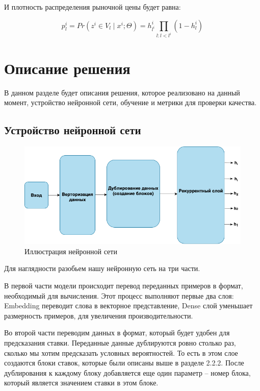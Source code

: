 \documentclass[times,specification,annotation]{itmo-student-thesis}
\begin{document}
И плотность распределения рыночной цены будет равна:

\begin{equation}\label{eq:nnP}
    p_l^i = Pr(z^i \in V_l \mid x^i; \Theta) = h_{l^i}^i \prod_{l: l < l^i} (1 - h_l^i)
\end{equation}


\section{Описание решения}

В данном разделе будет описания решения, которое реализовано на данный момент, устройство нейронной сети, обучение и метрики для проверки качества.

\subsection{Устройство нейронной сети}

\begin{figure}[h]
    \caption{Иллюстрация нейронной сети}
    \centering
    \includegraphics{nn.png}
\end{figure}

Для наглядности разобьем нашу нейронную сеть на три части.

В первой части модели происходит перевод переданных примеров в формат, необходимый для вычисления. 
Этот процесс выполняют первые два слоя: Embedding переводит слова в векторное представление, 
Dense слой уменьшает размерность примеров, для увеличения производительности.

Во второй части переводим данных в формат, который будет удобен для предсказания ставки. 
Переданные данные дублируются ровно столько раз, сколько мы хотим предсказать условных вероятностей. 
То есть в этом слое создаются блоки ставок, которые были описаны выше в разделе 2.2.2.
После дублирования к каждому блоку добавляется еще один параметр – номер блока, который является значением ставки в этом блоке.
\end{document}
